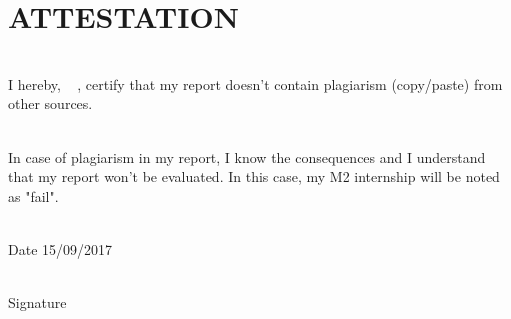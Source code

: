 \chapter*{ATTESTATION}



\vfill


\noindent\hrulefill

~\\


I hereby,  \FirstName~  \LastName, certify that my report doesn't contain plagiarism (copy/paste) from other sources.

~\\

In case of plagiarism in my report, I know the consequences and I understand that my report won't be evaluated. In this case, my M2 internship will be noted as "fail".


~\\

 Date 15/09/2017 

~\\
 
 Signature
 \vspace{2cm}
 
 
 
 
 
 \FirstName~  \LastName
 

~\\
~\\
~\\
~\\
~\\

\noindent\hrulefill


\vfill


\vfill



%
%
%
%
%
%
%
%
%
% 
% 
%
% 
%
%
%
%
%

